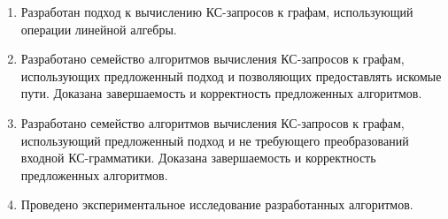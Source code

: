 \begin{enumerate}
  \item Разработан подход к вычислению КС-запросов к графам, использующий операции линейной алгебры.
  \item Разработано семейство алгоритмов вычисления КС-запросов к графам, использующих предложенный подход и позволяющих предоставлять искомые пути. Доказана завершаемость и корректность предложенных алгоритмов.
  \item Разработано семейство алгоритмов вычисления КС-запросов к графам, использующий предложенный подход и не требующего преобразований входной КС-грамматики. Доказана завершаемость и корректность предложенных алгоритмов.
  \item Проведено экспериментальное исследование разработанных алгоритмов.
\end{enumerate}
